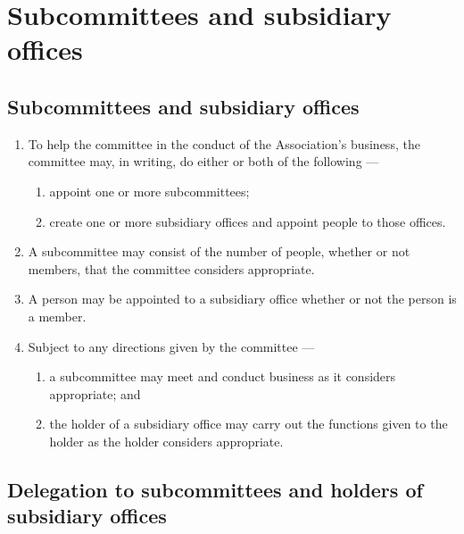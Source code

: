 \documentclass[../constitution.tex]{subfiles}
\begin{document}
\hypertarget{division-5-subcommittees-and-subsidiary-offices}{%
  \section{Subcommittees and subsidiary offices}\label{division-5-subcommittees-and-subsidiary-offices}}

\hypertarget{subcommittees-and-subsidiary-offices}{%
  \subsection{Subcommittees and subsidiary offices}\label{subcommittees-and-subsidiary-offices}}

\begin{enumerate}

  \item To help the committee in the conduct of the Association's business, the committee may, in writing, do either or both of the following ---

        \begin{enumerate}

          \item appoint one or more subcommittees; \label{appoint-subcommittees}
          \item create one or more subsidiary offices and appoint people to those offices.
        \end{enumerate}
  \item A subcommittee may consist of the number of people, whether or not members, that the committee considers appropriate.
  \item A person may be appointed to a subsidiary office whether or not the person is a member.
  \item Subject to any directions given by the committee ---

        \begin{enumerate}

          \item a subcommittee may meet and conduct business as it considers appropriate; and
          \item the holder of a subsidiary office may carry out the functions given to the holder as the holder considers appropriate.
        \end{enumerate}
\end{enumerate}

\hypertarget{delegation-to-subcommittees-and-holders-of-subsidiary-offices}{%
  \subsection{Delegation to subcommittees and holders of subsidiary offices}\label{delegation-to-subcommittees-and-holders-of-subsidiary-offices}}
\end{document}
